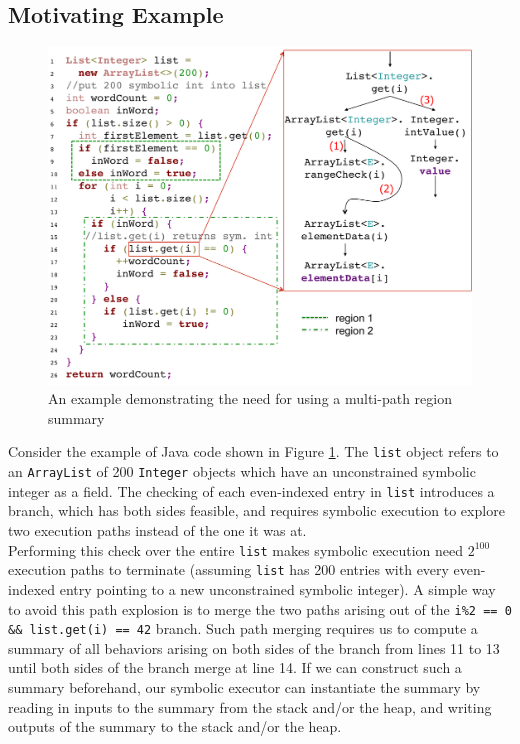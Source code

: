 \subsection{Motivating Example}
\begin{figure}
    \includegraphics[width=\textwidth]{figures/wordCount.pdf}
    \caption{An example demonstrating the need for using a multi-path region summary}
    \label{fig:mot-example}
\end{figure}
Consider the example of Java code shown in Figure \ref{fig:mot-example}.
%
The {\tt list} object refers to an {\tt ArrayList} of 200 {\tt Integer} objects which have an unconstrained symbolic
integer as a field.
%
The checking of each even-indexed entry in {\tt list} introduces a branch, which has both sides feasible, and requires
symbolic execution to explore two execution paths instead of the one it was at.\\
%
Performing this check over the entire {\tt list} makes symbolic execution need $2^{100}$ execution paths to terminate
(assuming {\tt list} has 200 entries with every even-indexed entry pointing to a new unconstrained symbolic integer).
%
A simple way to avoid this path explosion is to merge the two paths arising out of the {\tt i\%2 == 0 \&\& list.get(i) == 42} branch.
%
Such path merging requires us to compute a summary of all behaviors arising on both sides of the branch from lines 11 to 13
until both sides of the branch merge at line 14.
%
If we can construct such a summary beforehand, our symbolic executor can instantiate the summary by reading in inputs to
the summary from the stack and/or the heap, and writing outputs of the summary to the stack and/or the heap.\\
